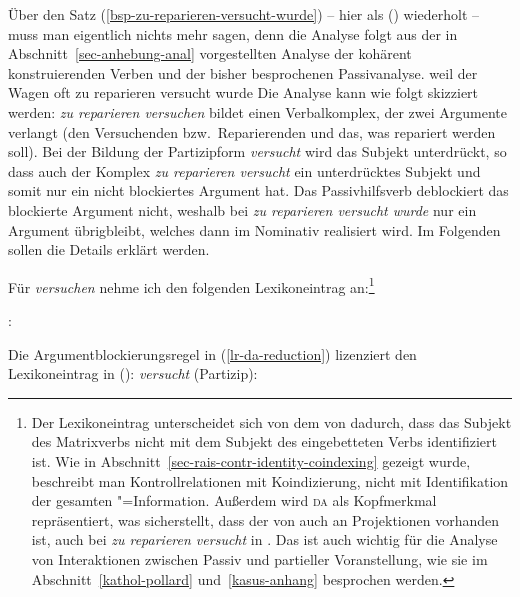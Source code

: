 {
Über den Satz (\ref{bsp-zu-reparieren-versucht-wurde}) -- hier als () wiederholt --
muss man eigentlich nichts mehr sagen, denn die Analyse folgt aus der in Abschnitt~\ref{sec-anhebung-anal}
vorgestellten Analyse der kohärent konstruierenden Verben und der bisher besprochenen
Passivanalyse.
\ea
\label{bsp-zu-reparieren-versucht-wurde-zwei}
weil    der Wagen oft zu reparieren versucht wurde
\z
Die Analyse kann wie folgt skizziert werden: \emph{zu reparieren versuchen} bildet einen
Verbalkomplex, der zwei Argumente verlangt (den Versuchenden bzw.\ Reparierenden und das, was
repariert werden soll). Bei der Bildung der Partizipform \emph{versucht} wird das Subjekt
unterdrückt, so dass auch der Komplex \emph{zu reparieren versucht} ein unterdrücktes Subjekt und
somit nur ein nicht blockiertes Argument hat. Das Passivhilfsverb deblockiert das blockierte
Argument nicht, weshalb bei \emph{zu reparieren versucht wurde} nur ein Argument übrigbleibt,
welches dann im Nominativ realisiert wird. Im Folgenden sollen die Details erklärt werden.

Für \emph{versuchen} nehme ich den folgenden Lexikoneintrag an:\footnote{
        Der Lexikoneintrag unterscheidet sich von dem von
        \citet[]{HM94a} dadurch, dass das Subjekt des Matrixverbs
        nicht mit dem Subjekt des eingebetteten Verbs identifiziert ist.
        Wie in Abschnitt~\ref{sec-rais-contr-identity-coindexing} gezeigt
        wurde, beschreibt man Kontrollrelationen mit Koindizierung, nicht mit Identifikation
        der gesamten "=Information.
        Außerdem wird \textsc{da} als Kopfmerkmal repräsentiert, was
        sicherstellt, dass der \daw von  auch an Projektionen vorhanden ist,
        \dash auch bei \emph{zu reparieren versucht} in .
        Das ist auch wichtig für die Analyse von Interaktionen zwischen Passiv
        und partieller Voranstellung, wie sie im Abschnitt~\ref{kathol-pollard}
        und~\ref{kasus-anhang} besprochen werden.%
}

\eas
\label{le-versuchen-da}%
:\\
\zs

\noindent
Die Argumentblockierungsregel in (\ref{lr-da-reduction}) lizenziert den Lexikoneintrag in ():
\eas
\label{le-versucht-hm}%
\emph{versucht} (Partizip):\\
\zs

}
